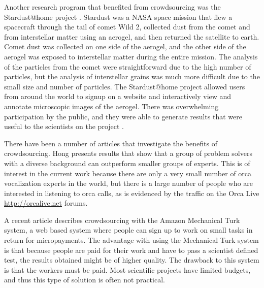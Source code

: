 Another research program that benefited from crowdsourcing was the
Stardust@home project \cite{mendez06_stardust}.  Stardust
\cite{atkins97_stardust} was a NASA space mission that flew a
spacecraft through the tail of comet Wild 2, collected dust from the
comet and from interstellar matter using an aerogel, and then returned
the satellite to earth.  Comet dust was collected on one side of the
aerogel, and the other side of the aerogel was exposed to interstellar
matter during the entire mission.  The analysis of the particles from
the comet were straightforward due to the high number of particles,
but the analysis of interstellar grains was much more difficult due to
the small size and number of particles.  The Stardust@home project
allowed users from around the world to signup on a website and
interactively view and annotate microscopic images of the aerogel.
There was overwhelming participation by the public, and they were able
to generate results that were useful to the scientists on the project
\cite{atkins97_stardust}.

There have been a number of articles that investigate the benefits of
crowdsourcing.  Hong \cite{hong04_crowdsourcing} presents results that
show that a group of problem solvers with a diverse background can
outperform smaller groups of experts.  This is of interest in the
current work because there are only a very small number of orca
vocalization experts in the world, but there is a large number of
people who are interested in listening to orca calls, as is evidenced
by the traffic on the Orca Live \url{http://orcalive.net} forums.

A recent article \cite{kittur08_crowdsourcing} describes crowdsourcing
with the Amazon Mechanical Turk system, a web based system where
people can sign up to work on small tasks in return for micropayments.
The advantage with using the Mechanical Turk system is that because
people are paid for their work and have to pass a scientist defined
test, the results obtained might be of higher quality.  The drawback
to this system is that the workers must be paid.  Most scientific
projects have limited budgets, and thus this type of solution is often
not practical.

